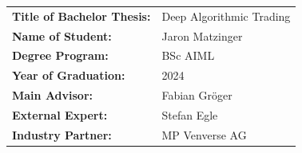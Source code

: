 \begin{titlepage}
\begin{flushleft}
        \begin{tabular}{@{}ll}
            \vspace{0.5cm}
            \large \textbf{Title of Bachelor Thesis:}  & 
            \large Deep Algorithmic Trading \\
            \vspace{0.5cm}
            \large \textbf{Name of Student:} &
            \large Jaron Matzinger \\
            \vspace{0.5cm}
            \large \textbf{Degree Program:} &
            \large BSc AIML \\
            \vspace{0.5cm}
            \large \textbf{Year of Graduation:} &
            \large 2024 \\
            \vspace{0.5cm}
            \large \textbf{Main Advisor:} &
            \large Fabian Gröger \\
            \vspace{0.5cm}
            \large \textbf{External Expert:} &
            \large Stefan Egle \\
            \vspace{0.5cm}
            \large \textbf{Industry Partner:} &
            \large MP Venverse AG \\
        \end{tabular}


\end{flushleft}
\end{titlepage}
